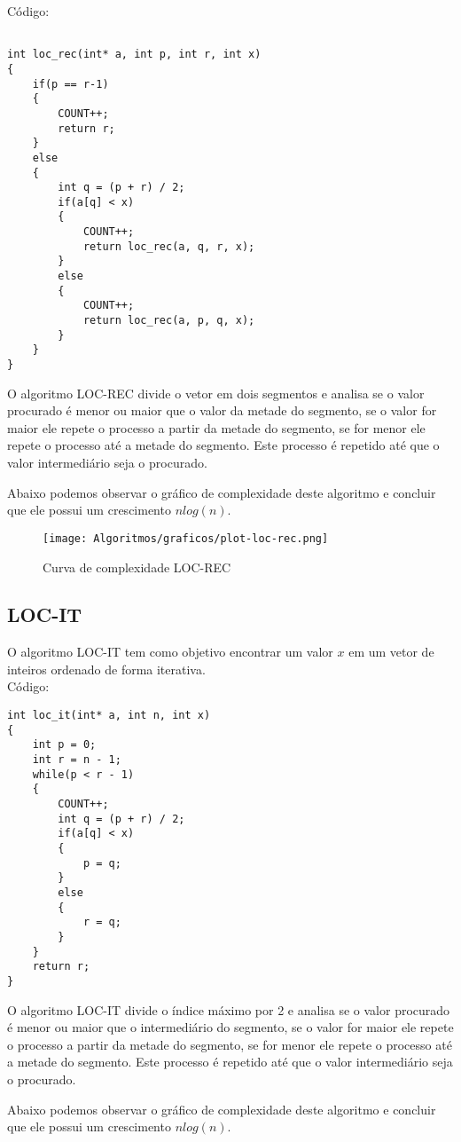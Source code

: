 \documentclass[a4paper, 12pt]{article}
\begin{document}
Código:

\begin{lstlisting}

int loc_rec(int* a, int p, int r, int x)
{
	if(p == r-1)
	{
		COUNT++;
		return r;
	}
	else
	{
		int q = (p + r) / 2; 
		if(a[q] < x)
		{
			COUNT++;
			return loc_rec(a, q, r, x);
		}
		else
		{
			COUNT++;
			return loc_rec(a, p, q, x); 
		}
	}
}	
\end{lstlisting}

O algoritmo LOC-REC divide o vetor em dois segmentos e analisa se o valor procurado é menor ou maior que o valor da metade do segmento, se o valor for maior ele repete o processo a partir da metade do segmento, se for menor ele repete o processo até a metade do segmento. Este processo é repetido até que o valor intermediário seja o procurado. 

Abaixo podemos observar o gráfico de complexidade deste algoritmo e concluir que ele possui um crescimento $nlog(n)$.

\begin{figure}[h]
	\centering
	\texttt{[image: Algoritmos/graficos/plot-loc-rec.png]}
	\caption{Curva de complexidade LOC-REC}
	\label{fig:loc-rec}
\end{figure}

\newpage

\subsection{LOC-IT}


O algoritmo LOC-IT tem como objetivo encontrar um valor $x$ em um vetor de inteiros ordenado de forma iterativa.\\


Código:

\begin{lstlisting}
int loc_it(int* a, int n, int x)
{
	int p = 0;
	int r = n - 1;
	while(p < r - 1)
	{
		COUNT++;
		int q = (p + r) / 2;
		if(a[q] < x)
		{
			p = q;
		}
		else
		{
			r = q;
		}
	}
	return r;
}
\end{lstlisting}

O algoritmo LOC-IT divide o índice máximo por 2 e analisa se o valor procurado é menor ou maior que o intermediário do segmento, se o valor for maior ele repete o processo a partir da metade do segmento, se for menor ele repete o processo até a metade do segmento. Este processo é repetido até que o valor intermediário seja o procurado. 

Abaixo podemos observar o gráfico de complexidade deste algoritmo e concluir que ele possui um crescimento $nlog(n)$.
\end{document}
